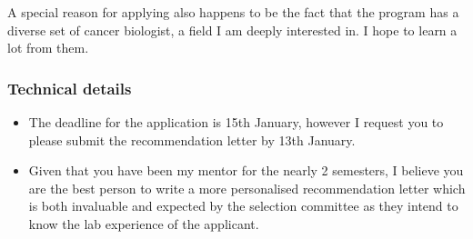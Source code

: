 \documentclass[12pt]{article}
\begin{document}
A special reason for applying also happens to be the fact that the program has a diverse set of cancer biologist, a 
field I am deeply interested in. I hope to learn a lot from them.


\subsubsection*{Technical details}
\begin{itemize}
    \item The deadline for the application is 15th January, however I request you to please submit the recommendation letter by 13th January.
    \item Given that you have been my mentor for the nearly 2 semesters, I believe you are the best person to write a more personalised recommendation letter which is both invaluable and expected by the selection committee as they intend to know the lab experience of the applicant.
\end{itemize}
\end{document}
